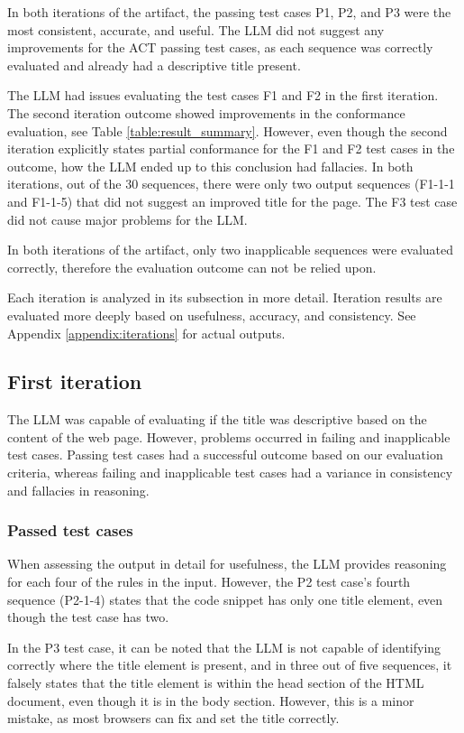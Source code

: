 In both iterations of the artifact, the passing test cases P1, P2, and P3 were the most consistent, accurate, and useful. The LLM did not suggest any improvements for the ACT passing test cases, as each sequence was correctly evaluated and already had a descriptive title present. 

The LLM had issues evaluating the test cases F1 and F2 in the first iteration. The second iteration outcome showed improvements in the conformance evaluation, see Table \ref{table:result_summary}. However, even though the second iteration explicitly states partial conformance for the F1 and F2 test cases in the outcome, how the LLM ended up to this conclusion had fallacies. In both iterations, out of the 30 sequences, there were only two output sequences (F1-1-1 and F1-1-5) that did not suggest an improved title for the page. The F3 test case did not cause major problems for the LLM.

In both iterations of the artifact, only two inapplicable sequences were evaluated correctly, therefore the evaluation outcome can not be relied upon.

Each iteration is analyzed in its subsection in more detail. Iteration results are evaluated more deeply based on usefulness, accuracy, and consistency. See Appendix \ref{appendix:iterations} for actual outputs.

\subsection{First iteration}

The LLM was capable of evaluating if the title was descriptive based on the content of the web page. However, problems occurred in failing and inapplicable test cases. Passing test cases had a successful outcome based on our evaluation criteria, whereas failing and inapplicable test cases had a variance in consistency and fallacies in reasoning.

\subsubsection{Passed test cases}

When assessing the output in detail for usefulness, the LLM provides reasoning for each four of the rules in the input. However, the P2 test case's fourth sequence (P2-1-4) states that the code snippet has only one title element, even though the test case has two. 

In the P3 test case, it can be noted that the LLM is not capable of identifying correctly where the title element is present, and in three out of five sequences, it falsely states that the title element is within the head section of the HTML document, even though it is in the body section. However, this is a minor mistake, as most browsers can fix and set the title correctly.

